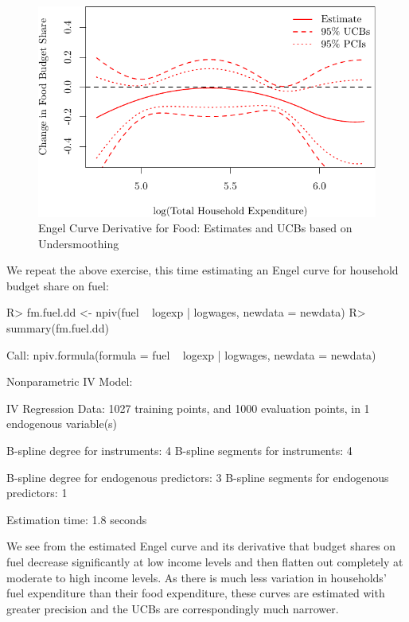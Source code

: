 \documentclass[
]{jss}
\begin{document}
\begin{figure}
\centering
\includegraphics{npiv_files/figure-latex/food-det-deriv-1.pdf}
\caption{Engel Curve Derivative for Food: Estimates and UCBs based on
Undersmoothing}
\end{figure}

We repeat the above exercise, this time estimating an Engel curve for
household budget share on fuel:

\begin{CodeChunk}
\begin{CodeInput}
R> fm.fuel.dd <- npiv(fuel ~ logexp | logwages, newdata = newdata)
R> summary(fm.fuel.dd)
\end{CodeInput}
\begin{CodeOutput}
Call:
npiv.formula(formula = fuel ~ logexp | logwages, newdata = newdata)

Nonparametric IV Model:

IV Regression Data: 1027 training points, and 1000 evaluation points, in 1 endogenous variable(s)

B-spline degree for instruments:             4
B-spline segments for instruments:           4

B-spline degree for endogenous predictors:   3
B-spline segments for endogenous predictors: 1

Estimation time: 1.8 seconds
\end{CodeOutput}
\end{CodeChunk}

We see from the estimated Engel curve and its derivative that budget
shares on fuel decrease significantly at low income levels and then
flatten out completely at moderate to high income levels. As there is
much less variation in households' fuel expenditure than their food
expenditure, these curves are estimated with greater precision and the
UCBs are correspondingly much narrower.
\end{document}
